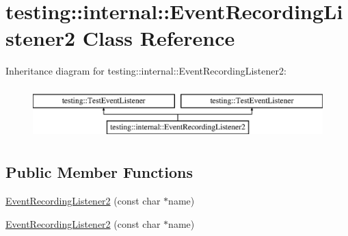 \hypertarget{classtesting_1_1internal_1_1_event_recording_listener2}{}\section{testing\+::internal\+::Event\+Recording\+Listener2 Class Reference}
\label{classtesting_1_1internal_1_1_event_recording_listener2}
Inheritance diagram for testing\+::internal\+::Event\+Recording\+Listener2\+:\begin{figure}[H]
\begin{center}
\leavevmode
\includegraphics[height=2.000000cm]{d5/d83/classtesting_1_1internal_1_1_event_recording_listener2}
\end{center}
\end{figure}
\subsection*{Public Member Functions}
\begin{DoxyCompactItemize}
\item 
\mbox{\hyperlink{classtesting_1_1internal_1_1_event_recording_listener2_a59b5e3d73b6ebb26e06dd28084ad9f68}{Event\+Recording\+Listener2}} (const char $\ast$name)
\item 
\mbox{\hyperlink{classtesting_1_1internal_1_1_event_recording_listener2_a59b5e3d73b6ebb26e06dd28084ad9f68}{Event\+Recording\+Listener2}} (const char $\ast$name)
\end{DoxyCompactItemize}
